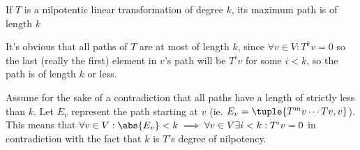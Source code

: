 \documentclass[10pt]{article}
\begin{document}
\begin{lemma}[maxPathLemma]{If $T$ is a nilpotentic linear transformation of degree $k$, its maximum path is of length $k$}

It's obvious that all paths of $T$ are at most of length $k$, since $\forall v\in V: T^kv=0$ so the last (really the first) element in $v$'s path will be $T^iv$ for some $i<k$, so the path is of length $k$ or less.

Assume for the sake of a contradiction that all paths have a length of strictly less than $k$. Let $E_v$ represent the path starting at $v$ (ie. $E_v=\tuple{T^mv\cdots Tv, v}$). This means that $\forall v\in V: \abs{E_v} < k \implies \forall v\in V \exists i<k: T^iv=0$ in contradiction with the fact that $k$ is $T$'s degree of nilpotency.

\end{lemma}
\end{document}
